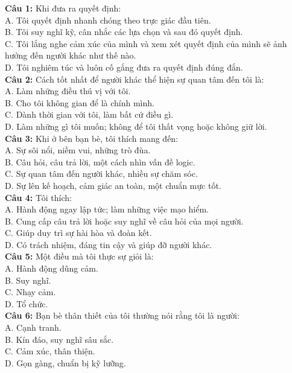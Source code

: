 \begin{multicols}{2}
\noindent
\textbf{Câu 1:} Khi đưa ra quyết định: \\
A. Tôi quyết định nhanh chóng theo trực giác đầu tiên. \\
B. Tôi suy nghĩ kỹ, cân nhắc các lựa chọn và sau đó quyết định. \\
C. Tôi lắng nghe cảm xúc của mình và xem xét quyết định của mình sẽ ảnh hưởng đến người khác như thế nào. \\
D. Tôi nghiêm túc và luôn cố gắng đưa ra quyết định đúng đắn. \\

\textbf{Câu 2:} Cách tốt nhất để người khác thể hiện sự quan tâm đến tôi là: \\
A. Làm những điều thú vị với tôi. \\
B. Cho tôi không gian để là chính mình. \\
C. Dành thời gian với tôi, làm bất cứ điều gì. \\
D. Làm những gì tôi muốn; không để tôi thất vọng hoặc không giữ lời. \\

\textbf{Câu 3:} Khi ở bên bạn bè, tôi thích mang đến: \\
A. Sự sôi nổi, niềm vui, những trò đùa. \\
B. Câu hỏi, câu trả lời, một cách nhìn vấn đề logic. \\
C. Sự quan tâm đến người khác, nhiều sự chăm sóc. \\
D. Sự lên kế hoạch, cảm giác an toàn, một chuẩn mực tốt. \\

\textbf{Câu 4:} Tôi thích: \\
A. Hành động ngay lập tức; làm những việc mạo hiểm. \\
B. Cung cấp câu trả lời hoặc suy nghĩ về câu hỏi của mọi người. \\
C. Giúp duy trì sự hài hòa và đoàn kết. \\
D. Có trách nhiệm, đáng tin cậy và giúp đỡ người khác. \\

\textbf{Câu 5:} Một điều mà tôi thực sự giỏi là: \\
A. Hành động dũng cảm. \\
B. Suy nghĩ. \\
C. Nhạy cảm. \\
D. Tổ chức. \\

\textbf{Câu 6:} Bạn bè thân thiết của tôi thường nói rằng tôi là người: \\
A. Cạnh tranh. \\
B. Kín đáo, suy nghĩ sâu sắc. \\
C. Cảm xúc, thân thiện. \\
D. Gọn gàng, chuẩn bị kỹ lưỡng. \\


\end{multicols}
